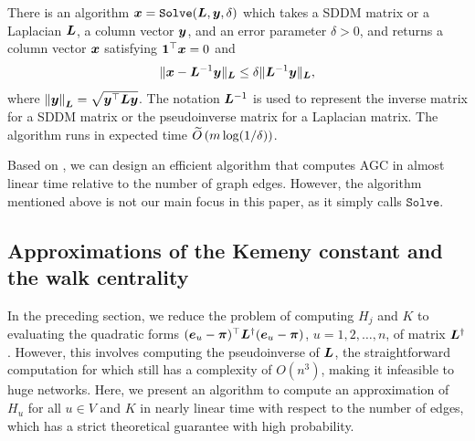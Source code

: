\documentclass[journal]{IEEEtran}
\begin{document}
\begin{lemma}
    \label{lemma:ST}
    There is an algorithm \(\boldsymbol{x} = \mathtt{Solve}(\boldsymbol{L},\boldsymbol{y},\delta)\) which
    takes a SDDM matrix or a Laplacian \(\boldsymbol{L}\),
    a column vector \(\boldsymbol{y}\), and an error
    parameter \(\delta > 0\), and returns a column vector \(\boldsymbol{x}\) satisfying  \(\boldsymbol{1}^\top\boldsymbol{x} = 0\) and
    \[
        \|\boldsymbol{x} - \boldsymbol{L}^{-1} \boldsymbol{y}\|_{\boldsymbol{L}} \leq \delta \|\boldsymbol{L}^{-1} \boldsymbol{y}\|_{\boldsymbol{L}},
    \]
    where \(\left\Vert\boldsymbol{y}\right\Vert_{\boldsymbol{L}} = \sqrt{\boldsymbol{y}^{\top} \boldsymbol{L} \boldsymbol{y}}\).
    The notation \(\boldsymbol{L}^{-1}\) is used to represent the inverse matrix for a SDDM matrix or the pseudoinverse matrix for a Laplacian matrix.
    The algorithm runs in expected time \(\widetilde{O} \left(m \log(1/\delta) \right)\).
\end{lemma}

Based on , we can design an efficient algorithm that computes AGC in almost linear time relative to the number of graph edges.
However, the algorithm mentioned above is not our main focus in this paper, as it simply calls \(\mathtt{Solve}\).

\subsection{Approximations of the Kemeny constant and the walk centrality}

In the preceding section, we reduce the problem of computing  \(H_j\) and \(K\) to evaluating the quadratic forms \((\boldsymbol{e}_u - \boldsymbol{\pi})^{\top} \boldsymbol{L}^{\dagger} (\boldsymbol{e}_u- \boldsymbol{\pi})\), \(u=1,2,\ldots, n\), of matrix  \(\boldsymbol{L}^{\dagger}\).
However,  this involves computing the pseudoinverse of \(\boldsymbol{L}\), the straightforward computation for which still has a complexity of \(O(n^3)\), making it infeasible to huge networks. Here, we present an algorithm to compute an approximation of \(H_u\) for all  \(u \in V\) and \(K\)  in nearly linear time with respect to the number of edges,  which has a strict theoretical guarantee with  high probability.

\end{document}
